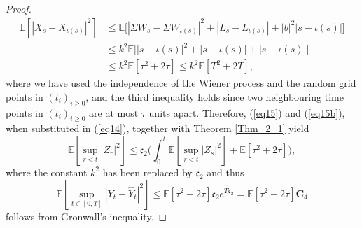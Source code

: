 \begin{proof}
\begin{equation}
    \begin{aligned}
        \mathbb{E}[|X_s - X_{\iota(s)}|^2] &\leq \mathbb{E}\big[|\Sigma W_s - \Sigma W_{\iota(s)}|^2 + |L_s - L_{\iota(s)}| + |b|^2|s - {\iota(s)}| \big]\\
        &\leq k^2 \mathbb{E}\big[ |s - {\iota(s)}|^2 + |s - {\iota(s)}| + |s - {\iota(s)}| \big]\\
        &\leq k^2 \mathbb{E} [\tau^2 + 2 \tau ] \leq k^2 \mathbb{E} [T^2 + 2T],
    \end{aligned}
\end{equation}
where we have used the independence of the Wiener process and the random grid points in $(t_{i})_{i \geq 0}$, and the third inequality holds since two neighbouring time points in $(t_{i})_{i \geq 0}$ are at most $\tau$ units apart.
Therefore, (\ref{eq15}) and (\ref{eq15b}), when substituted in (\ref{eq14}), together with Theorem \ref{Thm_2_1} yield
\begin{equation*}
    \mathbb{E}[\sup_{r < t}|Z_r|^2] \leq \mathfrak{c}_2 \bigg( \int^{t}_{0} \mathbb{E}[\sup_{r <t}|Z_s|^2] + \mathbb{E} [\tau^2 + 2 \tau] \bigg),
\end{equation*}
where the constant $k^2$ has been replaced by $\mathfrak{c}_2$ and thus
\begin{equation*}
      	\mathbb{E}[\sup_{t \in [0, T]}|Y_t - \hat{Y}_{t}|^2] \leq  \mathbb{E} [\tau^2 + 2 \tau]\mathfrak{c}_2e^{T\mathfrak{c}_2} = \mathbb{E} [\tau^2 + 2 \tau]\mathbf{C}_4
\end{equation*}
follows from Gronwall's inequality.
\end{proof}

